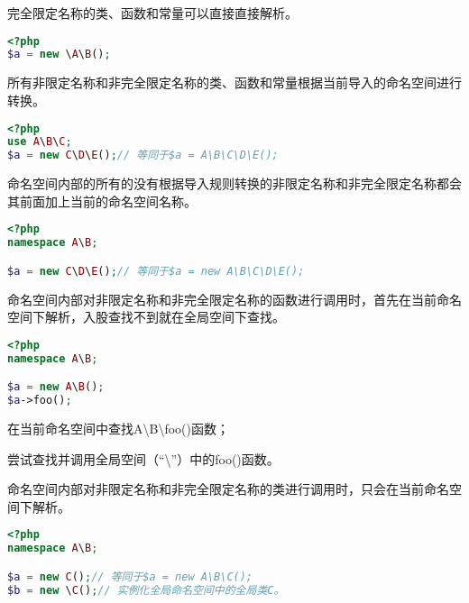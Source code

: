 \begin{compactitem}
\item 完全限定名称的类、函数和常量可以直接直接解析。

\begin{lstlisting}[language=PHP]
<?php
$a = new \A\B();
\end{lstlisting}

\item 所有非限定名称和非完全限定名称的类、函数和常量根据当前导入的命名空间进行转换。

\begin{lstlisting}[language=PHP]
<?php
use A\B\C;
$a = new C\D\E();// 等同于$a = A\B\C\D\E();
\end{lstlisting}

\item 命名空间内部的所有的没有根据导入规则转换的非限定名称和非完全限定名称都会其前面加上当前的命名空间名称。

\begin{lstlisting}[language=PHP]
<?php
namespace A\B;

$a = new C\D\E();// 等同于$a = new A\B\C\D\E();
\end{lstlisting}

\item 命名空间内部对非限定名称和非完全限定名称的函数进行调用时，首先在当前命名空间下解析，入股查找不到就在全局空间下查找。

\begin{lstlisting}[language=PHP]
<?php
namespace A\B;

$a = new A\B();
$a->foo();
\end{lstlisting}

\begin{compactenum}
\item 在当前命名空间中查找A\textbackslash B\textbackslash foo()函数；
\item 尝试查找并调用全局空间（“\textbackslash ”）中的foo()函数。
\end{compactenum}

\item 命名空间内部对非限定名称和非完全限定名称的类进行调用时，只会在当前命名空间下解析。

\begin{lstlisting}[language=PHP]
<?php
namespace A\B;

$a = new C();// 等同于$a = new A\B\C();
$b = new \C();// 实例化全局命名空间中的全局类C。
\end{lstlisting}

\end{compactitem}






